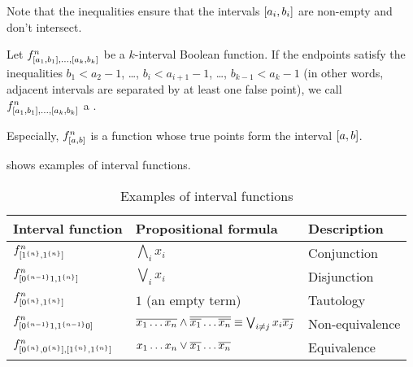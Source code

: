 Note that the inequalities ensure
that the intervals $[a_i, b_i]$
are non-empty and don't intersect.

\begin{definition}
\label{def:properkibf}
Let
$f^n_{[a_1, b_1], \ldots, [a_k, b_k]}$
be a $k$-interval Boolean function.
If the endpoints satisfy the inequalities
$b_1 < a_2 - 1$, \ldots, $b_i < a_{i+1} - 1$, \ldots,
$b_{k-1} < a_k - 1$
(in other words, adjacent intervals
are separated by at least one false point),
we call
$f^n_{[a_1, b_1], \ldots, [a_k, b_k]}$
a .
\end{definition}


Especially,
$f^{n}_{[a, b]}$ is a function
whose true points form the interval $[a, b]$.


shows
examples of interval functions.

\begin{table}[h]
\centering
\begin{tabular}{lll}
Interval function & Propositional formula & Description \\
\hline
$f^{n}_{[1^{\{n\}}, 1^{\{n\}}]}$ &
$\bigwedge_i{x_i}$ & Conjunction \\
$f^{n}_{[0^{\{n-1\}} 1, 1^{\{n\}}]}$ &
$\bigvee_i{x_i}$ & Disjunction \\
$f^{n}_{[0^{\{n\}}, 1^{\{n\}}]}$ &
$1$ (an empty term) & Tautology \\
$f^{n}_{[0^{\{n-1\}} 1, 1^{\{n-1\}} 0]}$ &
$\overline{x_1 \ldots x_n} \wedge
\overline{\overline{x_1} \ldots \overline{x_n}}
\equiv \bigvee_{i \neq j}{x_i \overline{x_j}}$ &
Non-equivalence \\
$f^n_{[0^{\{n\}}, 0^{\{n\}}],
[1^{\{n\}}, 1^{\{n\}}]}$ &
$x_1 \ldots x_n \vee \overline{x_1} \ldots \overline{x_n}$ &
Equivalence
\end{tabular}
\caption{Examples of interval functions}
\label{tab:exampleintfns}
\end{table}

